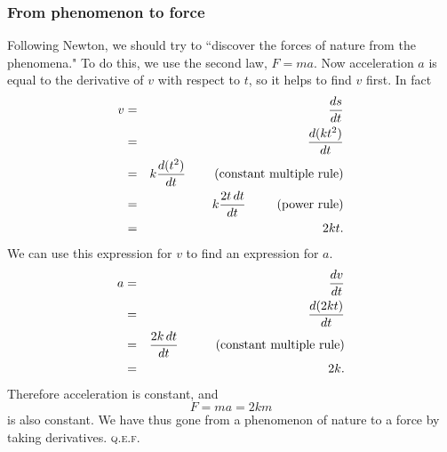\documentclass[polutonikogreek,english,twoside,openright]{article}
\begin{document}
\subsubsection*{From phenomenon to force}
Following Newton, we should try to ``discover the forces of nature
from the phenomena."  To do this, we use the second law, $F = ma$.
Now acceleration $a$ is equal to the derivative of $v$ with respect to
$t$, so it helps to find $v$ first.  In fact
\begin{eqnarray*}
  v & = & \frac{ds}{dt}\\
    & = & \frac{d(kt^2)}{dt}\\
    & = & k\frac{d(t^2)}{dt} \mbox{\hspace{2.3em}(constant multiple rule)}\\
    & = & k\frac{2t\,dt}{dt} \mbox{\hspace{2.5em}(power rule)}\\
    & = & 2kt.
\end{eqnarray*}
We can use this expression for $v$ to find an expression for $a$.
\begin{eqnarray*}
  a & = & \frac{dv}{dt}\\
    & = & \frac{d(2kt)}{dt}\\
    & = & \frac{2k\,dt}{dt}\mbox{\hspace{3em}(constant multiple rule)}\\
    & = & 2k.
\end{eqnarray*}
Therefore acceleration is constant, and 
$$F = ma = 2km$$
is also constant.  We have thus gone from a phenomenon of nature to a
force by taking derivatives. \textsc{q.e.f.}\vspace{2ex}
\end{document}
